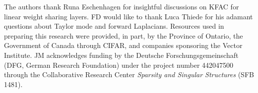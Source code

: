 \begin{ack} %
  The authors thank Runa Eschenhagen for insightful discussions on KFAC for linear weight sharing layers.
  FD would like to thank Luca Thiede for his adamant questions about Taylor mode and forward Laplacians.
  Resources used in preparing this research were provided, in part, by the Province of Ontario, the Government of Canada through CIFAR, and companies sponsoring the Vector Institute.
  JM acknowledges funding by the Deutsche Forschungsgemeinschaft (DFG, German Research Foundation) under the project number 442047500 through the Collaborative Research Center \emph{Sparsity and Singular Structures} (SFB 1481).
\end{ack}
